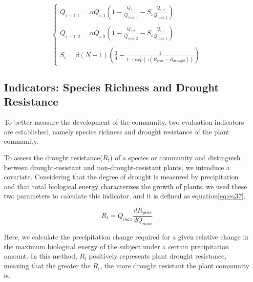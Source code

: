 \documentclass[12pt]{article}  %
\newenvironment{shrinkeq}[1]
{ \bgroup
	\addtolength\abovedisplayshortskip{#1}
	\addtolength\abovedisplayskip{#1}
	\addtolength\belowdisplayshortskip{#1}
	\addtolength\belowdisplayskip{#1}}
{\egroup\ignorespacesafterend}
\begin{document}
\begin{shrinkeq}{-1ex}
	\begin{equation}
    \label{eq:eq36}
    \left\{\begin{array}{l}
     Q_{i+1,1}=\alpha Q_{i,1}(1-\frac{Q_{i,1}}{Q_{max,1}}-S_i\frac{Q_{i,2}}{Q_{max,2}})\\
\\
    Q_{i+1,2}=\alpha Q_{i,2}(1-\frac{Q_{i,2}}{Q_{max,2}}-S_i\frac{Q_{i,1}}{Q_{max,1}})\\
\\
    S_i = \beta(N-1)(\frac{3}{4}-\frac{1}{1+exp(\gamma(R_{year}-R_{drought}))})
    \end{array}\right.
	\end{equation}
\end{shrinkeq}

\vspace{-0.5cm}
\subsection{Indicators: Species Richness and Drought Resistance}
\vspace{-0.3cm}
To better measure the development of the community, two evaluation indicators are established, namely species richness and drought resistance of the plant community.

To assess the drought resistance($R_t$) of a species or community and distinguish between drought-resistant and non-drought-resistant plants, we introduce a covariate. Considering that the degree of drought is measured by precipitation and that total biological energy characterizes the growth of plants, we used these two parameters to calculate this indicator, and it is defined as equation\eqref{eq:eq37}. 

\begin{shrinkeq}{-1ex}
	\begin{equation}
    \label{eq:eq37}
    R_t = Q_{max}\frac{dR_{year}}{dQ_{max}}
	\end{equation}
\end{shrinkeq}

\vspace{0.2cm}
Here, we calculate the precipitation change required for a given relative change in the maximum biological energy of the subject under a certain precipitation amount. In this method, $R_t$ positively represents plant drought resistance, meaning that the greater the $R_t$, the more drought resistant the plant community is.  
\end{document}
